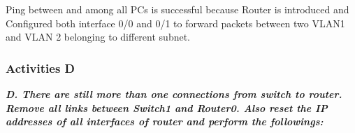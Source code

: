 \documentclass[a4paper,11pt]{article}
\begin{document}
\begin{enumerate}








          Ping between and among all PCs is successful because Router is introduced and Configured  both interface 0/0 and 0/1  to forward packets between two VLAN1 and VLAN 2 belonging to different subnet.

\end{enumerate}


\pagebreak


%
%
%
%

%
%
%
%
%
%
%



\subsubsection{Activities D}

{\bfseries \textit{D. There are still more than one connections from switch to router. Remove all links between
        Switch1 and Router0. Also reset the IP addresses of all interfaces of router and perform the
        followings:}}
\end{document}
